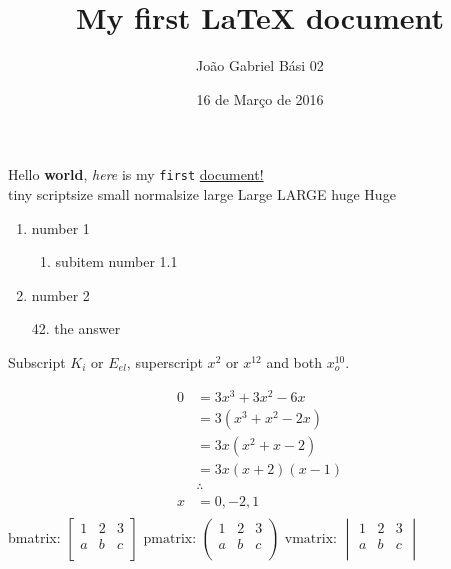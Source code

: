 \documentclass[12pt, a4paper]{article} %
\title{My first \LaTeX{} document}
\date{16 de Março de 2016}
\author{João Gabriel Bási 02}
\begin{document}
\maketitle

Hello \textbf{world}, \textit{here} is {\color{red} my} \texttt{first} \underline{document!} \\
\tiny tiny \scriptsize scriptsize \small small \normalsize normalsize \large large \Large Large \LARGE LARGE \huge huge \Huge Huge \normalsize

\begin{enumerate}
\item number 1
\begin{enumerate}
\item subitem number 1.1
\end{enumerate}
\item number 2
\item[42.] the answer
\end{enumerate}

Subscript $K_i$ or $E_{el}$, superscript $x^2$ or $x^{12}$ and both $x^{10}_o$.

\begin{align}
0 &= 3x^3+3x^2-6x   \\
   &= 3(x^3+x^2-2x)   \\
   &= 3x(x^2+x-2)        \\
   &= 3x(x+2)(x-1)        \\
   &\therefore              \\
x &= 0, -2, 1\\
\end{align}
bmatrix:
$
\begin{bmatrix}
1 & 2 & 3 \\
a & b & c \\
\end{bmatrix}
\text { pmatrix: }
\begin{pmatrix}
1 & 2 & 3 \\
a & b & c \\
\end{pmatrix}
\text { vmatrix: }
\begin{vmatrix}
1 & 2 & 3 \\
a & b & c \\
\end{vmatrix}
$ \\
\end{document}
